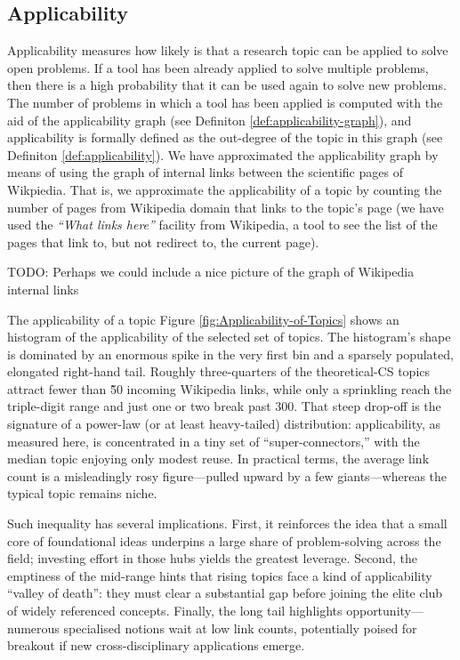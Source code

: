 %
%
\subsection{Applicability}

Applicability measures how likely is that a research topic can be applied to solve open problems. If a tool has been already applied to solve multiple problems, then there is a high probability that it can be used again to solve new problems. The number of problems in which a tool has been applied is computed with the aid of the applicability graph (see Definiton \ref{def:applicability-graph}), and applicability is formally defined as the out-degree of the topic in this graph (see Definiton \ref{def:applicability}). We have approximated the applicability graph by means of using the graph of internal links between the scientific pages of Wikpiedia. That is, we approximate the applicability of a topic by counting the number of pages from Wikipedia domain that links to the topic's page (we have used the \emph{``What links here''} facility from Wikipedia, a tool to see the list of the pages that link to, but not redirect to, the current page).

{\color{red}TODO: Perhaps we could include a nice picture of the graph of Wikipedia internal links}

The applicability of a topic Figure \ref{fig:Applicability-of-Topics} shows an histogram of the applicability of the selected set of topics. The histogram’s shape is dominated by an enormous spike in the very first bin and a sparsely populated, elongated right-hand tail. Roughly three-quarters of the theoretical-CS topics attract fewer than \~50 incoming Wikipedia links, while only a sprinkling reach the triple-digit range and just one or two break past 300. That steep drop-off is the signature of a power-law (or at least heavy-tailed) distribution: applicability, as measured here, is concentrated in a tiny set of “super-connectors,” with the median topic enjoying only modest reuse. In practical terms, the average link count is a misleadingly rosy figure—pulled upward by a few giants—whereas the typical topic remains niche.

Such inequality has several implications. First, it reinforces the idea that a small core of foundational ideas underpins a large share of problem-solving across the field; investing effort in those hubs yields the greatest leverage. Second, the emptiness of the mid-range hints that rising topics face a kind of applicability “valley of death”: they must clear a substantial gap before joining the elite club of widely referenced concepts. Finally, the long tail highlights opportunity—numerous specialised notions wait at low link counts, potentially poised for breakout if new cross-disciplinary applications emerge.

